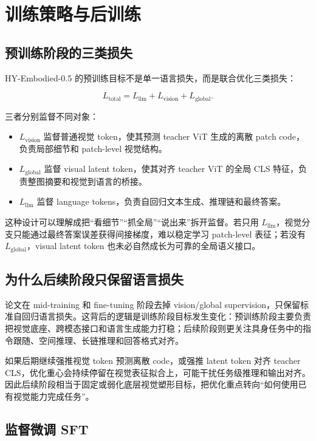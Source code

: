\section{训练策略与后训练}

\subsection{预训练阶段的三类损失}

HY-Embodied-0.5 的预训练目标不是单一语言损失，而是联合优化三类损失：

\begin{equation}
    L_{\text{total}}
    = L_{\text{llm}} + L_{\text{vision}} + L_{\text{global}}.
\end{equation}

三者分别监督不同对象：

\begin{itemize}
    \item $L_{\text{vision}}$ 监督普通视觉 token，使其预测 teacher ViT 生成的离散 patch code，负责局部细节和 patch-level 视觉结构。
    \item $L_{\text{global}}$ 监督 visual latent token，使其对齐 teacher ViT 的全局 CLS 特征，负责整图摘要和视觉到语言的桥接。
    \item $L_{\text{llm}}$ 监督 language tokens，负责自回归文本生成、推理链和最终答案。
\end{itemize}

这种设计可以理解成把“看细节”“抓全局”“说出来”拆开监督。若只用 $L_{\text{llm}}$，视觉分支只能通过最终答案误差获得间接梯度，难以稳定学习 patch-level 表征；若没有 $L_{\text{global}}$，visual latent token 也未必自然成长为可靠的全局语义接口。

\subsection{为什么后续阶段只保留语言损失}

论文在 mid-training 和 fine-tuning 阶段去掉 vision/global supervision，只保留标准自回归语言损失。这背后的逻辑是训练阶段目标发生变化：预训练阶段主要负责把视觉底座、跨模态接口和语言生成能力打稳；后续阶段则更关注具身任务中的指令跟随、空间推理、长链推理和回答格式对齐。

如果后期继续强推视觉 token 预测离散 code，或强推 latent token 对齐 teacher CLS，优化重心会持续停留在视觉表征拟合上，可能干扰任务级推理和输出对齐。因此后续阶段相当于固定或弱化底层视觉塑形目标，把优化重点转向“如何使用已有视觉能力完成任务”。

\subsection{监督微调 SFT}

